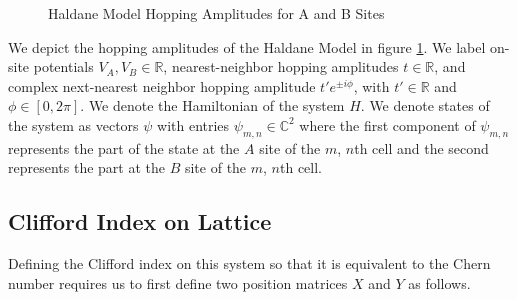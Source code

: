 \documentclass[a4paper]{article}
\begin{document}
\begin{figure}
\centering
{}%

%

\caption{Haldane Model Hopping Amplitudes for A and B Sites}%
\label{fig:hopping amplitudes}%
\end{figure}

We depict the hopping amplitudes of the Haldane Model in figure \ref{fig:hopping amplitudes}. We label on-site potentials $V_A, V_B \in \mathbb{R}$, nearest-neighbor hopping amplitudes $t\in \mathbb{R}$, and complex next-nearest neighbor hopping amplitude $t'e^{\pm i\phi}$, with $t'\in\mathbb{R}$ and $\phi\in[0,2\pi]$. We denote the Hamiltonian of the system $H$. We denote states of the system as vectors $\psi$ with entries $\psi_{m,n} \in \mathbb{C}^2$ where the first component of $\psi_{m,n}$ represents the part of the state at the $A$ site of the $m$, $n$th cell and the second represents the part at the $B$ site of the $m$, $n$th cell.

\subsection{Clifford Index on Lattice}
Defining the Clifford index on this system so that it is equivalent to the Chern number requires us to first define two position matrices $X$ and $Y$ as follows.
\end{document}
